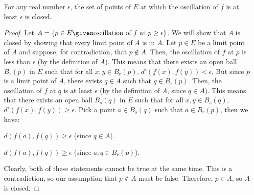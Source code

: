 \begin{answer}
  \begin{claim}
    For any real number $\epsilon$, the set of points of $E$
    at which the oscillation of $f$ is at least $\epsilon$ is closed.
    \begin{proof}
      Let $A = \set{p \in E \given \text{oscillation of $f$ at $p$} \geq \epsilon}$.
      We will show that $A$ is closed by showing that every limit point of $A$ is in $A$.
      Let $p \in E$ be a limit point of $A$ and suppose, for contradiction,
      that $p \notin A$.
      Then, the oscillation of $f$ at $p$ is less than $\epsilon$ (by the definition of $A$).
      This means that there exists an open ball $B_r(p)$ in $E$ such that
      for all $x, y \in B_r(p)$, $d'(f(x), f(y)) < \epsilon$.
      But since $p$ is a limit point of $A$, there exists $q \in A$ such that $q \in B_r(p)$.
      Then, the oscillation of $f$ at $q$ is at least $\epsilon$ (by the definition of $A$, since $q \in A$).
      This means that there exists an open ball $B_s(q)$ in $E$ such that
      for all $x, y \in B_s(q)$, $d'(f(x), f(y)) \geq \epsilon$.
      Pick a point $a \in B_s(q)$ such that $a \in B_r(p)$,
      then we have:
      \begin{enumarabic}
        \item $d(f(a), f(q)) \geq \epsilon$ (since $q \in A$).
        \item $d(f(a), f(q)) \geq \epsilon$ (since $a, q \in B_r(p)$).
      \end{enumarabic}
      Clearly, both of these statements cannot be true at the same time.
      This is a contradiction, so our assumption that $p \notin A$ must be false.
      Therefore, $p \in A$, so $A$ is closed.
    \end{proof}
  \end{claim}
\end{answer}
